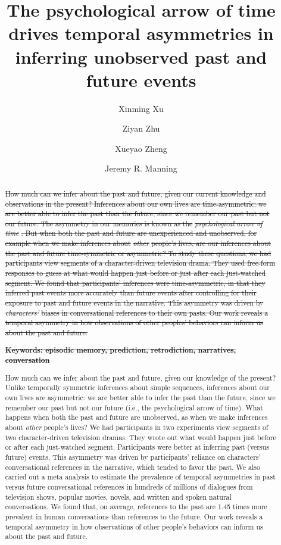 \documentclass[10pt]{article}
\title{\Large The psychological arrow of time drives temporal asymmetries in inferring unobserved past and future events} %
\author[1]{Xinming Xu}
\author[2]{Ziyan Zhu}
\author[3]{Xueyao Zheng} %
\author[1, $\star$]{Jeremy R. Manning}
\affil[1]{Dartmouth College, Hanover, NH, USA}
\affil[2]{Peking University, Beijing, China}
\affil[3]{Beijing Normal University, Beijing, China} %
\affil[$\star$]{Address correspondence to jeremy.r.manning@dartmouth.edu}
\providecommand{\DIFdeltex}[1]{{\protect\color{red}\sout{#1}}}                      %
\providecommand{\DIFaddbegin}{} %
\providecommand{\DIFdelbegin}{} %
\providecommand{\DIFdelend}{} %
\providecommand{\DIFdel}[1]{\texorpdfstring{\DIFdeltex{#1}}{}} %
\newcommand{\DIFscaledelfig}{0.5}
\newlength{\DIFdelgraphicswidth} %
\newlength{\DIFdelgraphicsheight} %
\newcommand{\DIFaddincludegraphics}[2][]{{\color{blue}\fbox{\DIFOincludegraphics[#1]{#2}}}} %
\newcommand{\DIFdelincludegraphics}[2][]{%
\sbox{\DIFdelgraphicsbox}{\DIFOincludegraphics[#1]{#2}}%
\settoboxwidth{\DIFdelgraphicswidth}{\DIFdelgraphicsbox} %
\settoboxtotalheight{\DIFdelgraphicsheight}{\DIFdelgraphicsbox} %
\scalebox{\DIFscaledelfig}{%
\parbox[b]{\DIFdelgraphicswidth}{\usebox{\DIFdelgraphicsbox}\\[-\baselineskip] \rule{\DIFdelgraphicswidth}{0em}}\llap{\resizebox{\DIFdelgraphicswidth}{\DIFdelgraphicsheight}{%
\setlength{\unitlength}{\DIFdelgraphicswidth}%
\begin{picture}(1,1)%
\thicklines\linethickness{2pt} %
{\color[rgb]{1,0,0}\put(0,0){\framebox(1,1){}}}%
{\color[rgb]{1,0,0}\put(0,0){\line( 1,1){1}}}%
{\color[rgb]{1,0,0}\put(0,1){\line(1,-1){1}}}%
\end{picture}%
}\hspace*{3pt}}} %
} %
\DeclareRobustCommand{\DIFaddbegin}{\DIFOaddbegin \let\includegraphics\DIFaddincludegraphics} %
\DeclareRobustCommand{\DIFdelbegin}{\DIFOdelbegin \let\includegraphics\DIFdelincludegraphics} %
\DeclareRobustCommand{\DIFdelend}{\DIFOaddend \let\includegraphics\DIFOincludegraphics} %
\begin{document}
\maketitle

\begin{abstract} {\DIFdelbegin %
\DIFdel{How much can we infer about the past and future, given our current knowledge and observations in the present?  Inferences about our own lives are time-asymmetric: we are better able to infer the past than the future, since we remember our past but not our future.  The asymmetry in our memories is known as the }\textit{\DIFdel{psychological arrow of time}}%
\DIFdel{.  But when both the past and future are unexperienced and unobserved, for example when we make inferences about }\textit{\DIFdel{other}} %
\DIFdel{people's lives, are our inferences about the past and future time-symmetric or asymmetric?  To study these questions, we had participants view segments of a character-driven television drama.  They used free-form responses to guess at what would happen just before or just after each just-watched segment.  We found that participants' inferences were time-asymmetric, in that they inferred past events more accurately than future events after controlling for their exposure to past and future events in the narrative.  This asymmetry was driven by }\textit{\DIFdel{characters'}} %
\DIFdel{biases in conversational references to their own pasts.  Our work reveals a temporal asymmetry in how observations of other peoples’ behaviors can inform us about the past and future.
}%

\textbf{\DIFdel{Keywords: episodic memory, prediction, retrodiction, narratives, conversation}}%
\DIFdelend \DIFaddbegin \footnotesize{ How much can we infer about the past and future, given our knowledge of the present? Unlike temporally symmetric inferences about simple sequences, inferences about our own lives are asymmetric: we are better able to infer the past than the future, since we remember our past but not our future (i.e., the psychological arrow of time). What happens when both the past and future are unobserved, as when we make inferences about \textit{other} people's lives? We had participants in two experiments view segments of two character-driven television dramas. They wrote out what would happen just before or after each just-watched segment. Participants were better at inferring past (versus future) events. This asymmetry was driven by participants’ reliance on characters’ conversational references in the narrative, which tended to favor the past. We also carried out a meta analysis to estimate the prevalence of temporal asymmetries in past versus future conversational references in hundreds of millions of dialogues from television shows, popular movies, novels, and written and spoken natural conversations. We found that, on average, references to the past are 1.45 times more prevalent in human conversations than references to the future. Our work reveals a temporal asymmetry in how observations of other people’s behaviors can inform us about the past and future.

}}
\end{abstract}
\end{document}
